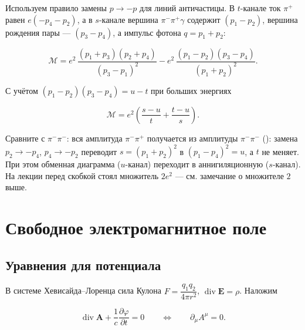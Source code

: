 \documentclass[../final.tex]{subfiles}
\begin{document}
Используем правило замены $p\to-p$ для линий античастицы.
В $t$-канале ток $\pi^+$ равен $e(-p_4-p_2)$, а в $s$-канале
вершина $\pi^-\pi^+\gamma$ содержит $(p_1-p_2)$, вершина рождения
пары --- $(p_3-p_4)$, а импульс фотона $q=p_1+p_2$:

\begin{equation*}
    \mathcal M
    =
    e^2\,
    \frac{\left(p_1+p_3\right)\left(p_2+p_4\right)}
         {\left(p_3-p_1\right)^2}
    -e^2\,
    \frac{\left(p_1-p_2\right)\left(p_3-p_4\right)}
         {\left(p_1+p_2\right)^2}.
\end{equation*}

С учётом $(p_1-p_2)(p_3-p_4)=u-t$ при больших энергиях

\begin{equation*}
    \mathcal M
    =
    e^2
    \left(
        \frac{s-u}{t}
        +
        \frac{t-u}{s}
    \right).
\end{equation*}

\remark
Сравните с $\pi^-\pi^-$: вся амплитуда $\pi^-\pi^+$ получается
из амплитуды $\pi^-\pi^-$ 
(): замена $p_2\to-p_4$,
$p_4\to-p_2$ переводит $s=(p_1+p_2)^2$ в $(p_1-p_4)^2=u$, а $t$
не меняет. При этом обменная диаграмма ($u$-канал) переходит
в аннигиляционную ($s$-канал). На лекции перед скобкой
стоял множитель $2e^2$ --- см. замечание о множителе $2$ выше.


\section{Свободное электромагнитное поле}
\label{sec:free_em_field}

\subsection{Уравнения для потенциала}

В системе Хевисайда--Лоренца сила Кулона
$F=\dfrac{q_1q_2}{4\pi r^2}$, $\operatorname{div}\mathbf E=\rho$.
Наложим 

\begin{equation*}
    \operatorname{div}\mathbf A
    +
    \frac{1}{c}\frac{\partial\varphi}{\partial t}
    =
    0
    \qquad\Longleftrightarrow\qquad
    \partial_\mu A^\mu=0.
\end{equation*}
\end{document}
